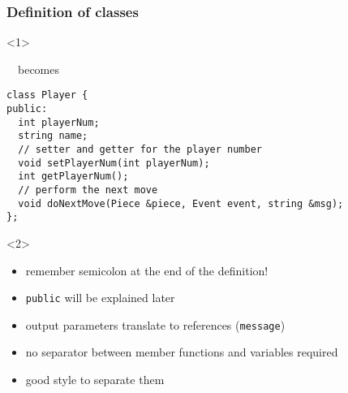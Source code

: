 \documentclass{slides}
\begin{document}
\begin{frame}[fragile]
  \frametitle{Definition of classes}

  \begin{onlyenv}<1> 
    ~~becomes
    \medskip
\end{onlyenv}

\begin{lstlisting}[emph={class,public}]
class Player {
public:
  int playerNum;
  string name;
  // setter and getter for the player number
  void setPlayerNum(int playerNum);
  int getPlayerNum();
  // perform the next move
  void doNextMove(Piece &piece, Event event, string &msg);
};
\end{lstlisting}

\begin{onlyenv}<2>
  \begin{itemize}
  \item \alert{remember semicolon at the end of the definition!}
  \item \lstinline!public! will be explained later
  \item output parameters translate to references (\lstinline!message!)
  \item no separator between member functions and variables required
  \item good style to separate them
  \end{itemize}
\end{onlyenv}
\end{frame}
\end{document}
